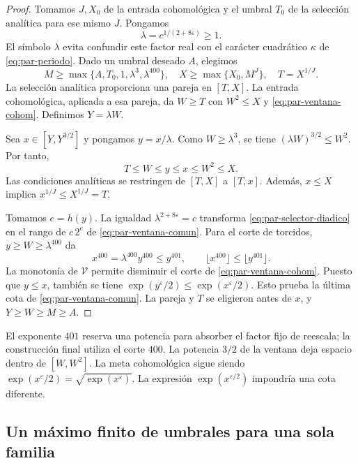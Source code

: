 \begin{proof}
Tomamos $J,X_0$ de la entrada cohomológica y el umbral $T_0$
de la selección analítica para ese mismo $J$. Pongamos
\[
 \lambda=c^{1/(2+8\varepsilon)}\ge1.
\]
El símbolo $\lambda$ evita confundir este factor real con el
carácter cuadrático $\kappa$ de \eqref{eq:par-periodo}.
Dado un umbral deseado $A$, elegimos
\[
 M\ge\max\{A,T_0,1,\lambda^3,\lambda^{400}\},
 \quad X\ge\max\{X_0,M^J\},\quad T=X^{1/J}.
\]
La selección analítica proporciona una pareja en $[T,X]$.
La entrada cohomológica, aplicada a esa pareja, da $W\ge T$
con $W^2\le X$ y \eqref{eq:par-ventana-cohom}.
Definimos $Y=\lambda W$.

Sea $x\in[Y,Y^{3/2}]$ y pongamos $y=x/\lambda$.
Como $W\ge\lambda^3$, se tiene
$(\lambda W)^{3/2}\le W^2$. Por tanto,
\begin{equation}
 T\le W\le y\le x\le W^2\le X.
 \label{eq:par-inclusiones}
\end{equation}
Las condiciones analíticas se restringen de $[T,X]$ a $[T,x]$.
Además, $x\le X$ implica $x^{1/J}\le X^{1/J}=T$.

Tomamos $e=h(y)$. La igualdad
$\lambda^{2+8\varepsilon}=c$ transforma
\eqref{eq:par-selector-diadico} en el rango de $c\,2^e$
de \eqref{eq:par-ventana-comun}. Para el corte de torcidos,
$y\ge W\ge\lambda^{400}$ da
\begin{equation}
 x^{400}=\lambda^{400}y^{400}\le y^{401},
 \qquad
 \lfloor x^{400}\rfloor\le\lfloor y^{401}\rfloor.
 \label{eq:par-corte}
\end{equation}
La monotonía de $\mathcal V$ permite disminuir el corte de
\eqref{eq:par-ventana-cohom}. Puesto que $y\le x$,
también se tiene $\exp(y^\varepsilon/2)\le\exp(x^\varepsilon/2)$.
Esto prueba la última cota de \eqref{eq:par-ventana-comun}.
La pareja y $T$ se eligieron antes de $x$, y
$Y\ge W\ge M\ge A$.
\end{proof}

El exponente $401$ reserva una potencia para absorber el factor fijo
de reescala; la construcción final utiliza el corte $400$.
La potencia $3/2$ de la ventana deja espacio dentro de $[W,W^2]$.
La meta cohomológica sigue siendo
$\exp(x^\varepsilon/2)=\sqrt{\exp(x^\varepsilon)}$.
La expresión $\exp(x^{\varepsilon/2})$ impondría una cota diferente.

\subsection{Un máximo finito de umbrales para una sola familia}


